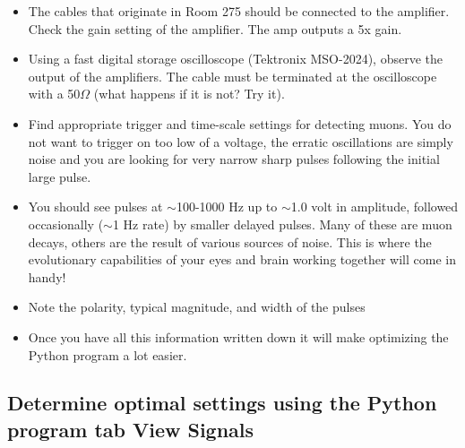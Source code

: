 \documentclass{../lab}
\begin{document}
    \begin{itemize}
        \item The cables that originate in Room 275 should be connected to the amplifier. Check the gain setting of the amplifier. The amp outputs a 5x gain. 

        \item Using a fast digital storage oscilloscope (Tektronix MSO-2024), observe the output of the amplifiers. The cable must be terminated at the oscilloscope with a 50$\Omega$ (what happens if it is not? Try it).

        \item Find appropriate trigger and time-scale settings for detecting muons. You do not want to trigger on too low of a voltage, the erratic oscillations are simply noise and you are looking for very narrow sharp pulses following the initial large pulse.

        \item You should see pulses at $\sim$100-1000 Hz up to $\sim$1.0 volt in amplitude, followed occasionally ($\sim$1 Hz rate) by smaller delayed pulses. Many of these are muon decays, others are the result of various sources of noise. This is where the evolutionary capabilities of your eyes and brain working together will come in handy! 

        \item Note the polarity, typical magnitude, and width of the pulses

        \item Once you have all this information written down it will make optimizing the Python program a lot easier.

    \end{itemize}


\subsection{Determine optimal settings using the Python program tab View Signals}
\end{document}
